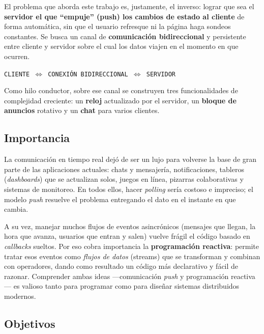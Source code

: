 \documentclass[12pt,a4paper]{article}
\begin{document}
El problema que aborda este trabajo es, justamente, el inverso: lograr que sea el \textbf{servidor el que ``empuje'' (push) los cambios de estado al cliente} de forma automática, sin que el usuario refresque ni la página haga sondeos constantes. Se busca un canal de \textbf{comunicación bidireccional} y persistente entre cliente y servidor sobre el cual los datos viajen en el momento en que ocurren.

\begin{center}
\texttt{CLIENTE \;$\Longleftrightarrow$\; CONEXIÓN BIDIRECCIONAL \;$\Longleftrightarrow$\; SERVIDOR}
\end{center}

Como hilo conductor, sobre ese canal se construyen tres funcionalidades de complejidad creciente: un \textbf{reloj} actualizado por el servidor, un \textbf{bloque de anuncios} rotativo y un \textbf{chat} para varios clientes.

\subsection{Importancia}

La comunicación en tiempo real dejó de ser un lujo para volverse la base de gran parte de las aplicaciones actuales: chats y mensajería, notificaciones, tableros (\textit{dashboards}) que se actualizan solos, juegos en línea, pizarras colaborativas y sistemas de monitoreo. En todos ellos, hacer \textit{polling} sería costoso e impreciso; el modelo \textit{push} resuelve el problema entregando el dato en el instante en que cambia.

A su vez, manejar muchos flujos de eventos asincrónicos (mensajes que llegan, la hora que avanza, usuarios que entran y salen) vuelve frágil el código basado en \textit{callbacks} sueltos. Por eso cobra importancia la \textbf{programación reactiva}: permite tratar esos eventos como \emph{flujos de datos} (streams) que se transforman y combinan con operadores, dando como resultado un código más declarativo y fácil de razonar. Comprender ambas ideas —comunicación \textit{push} y programación reactiva— es valioso tanto para programar como para diseñar sistemas distribuidos modernos.

\subsection{Objetivos}
\end{document}
